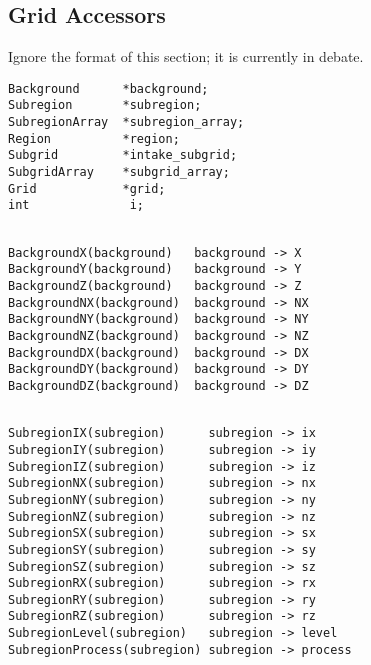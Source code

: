 
\subsection{Grid Accessors}
\label{Grid Accessors}

Ignore the format of this section; it is currently in debate.

\begin{display}\begin{verbatim}
Background      *background;
Subregion       *subregion;
SubregionArray  *subregion_array;
Region          *region;
Subgrid         *intake_subgrid;
SubgridArray    *subgrid_array;
Grid            *grid;
int              i;
\end{verbatim}\end{display}

\begin{display}\begin{verbatim}

BackgroundX(background)   background -> X
BackgroundY(background)   background -> Y
BackgroundZ(background)   background -> Z
BackgroundNX(background)  background -> NX
BackgroundNY(background)  background -> NY
BackgroundNZ(background)  background -> NZ
BackgroundDX(background)  background -> DX
BackgroundDY(background)  background -> DY
BackgroundDZ(background)  background -> DZ

\end{verbatim}\end{display}

\begin{display}\begin{verbatim}

SubregionIX(subregion)      subregion -> ix
SubregionIY(subregion)      subregion -> iy
SubregionIZ(subregion)      subregion -> iz
SubregionNX(subregion)      subregion -> nx
SubregionNY(subregion)      subregion -> ny
SubregionNZ(subregion)      subregion -> nz
SubregionSX(subregion)      subregion -> sx
SubregionSY(subregion)      subregion -> sy
SubregionSZ(subregion)      subregion -> sz
SubregionRX(subregion)      subregion -> rx
SubregionRY(subregion)      subregion -> ry
SubregionRZ(subregion)      subregion -> rz
SubregionLevel(subregion)   subregion -> level
SubregionProcess(subregion) subregion -> process

\end{verbatim}\end{display}

